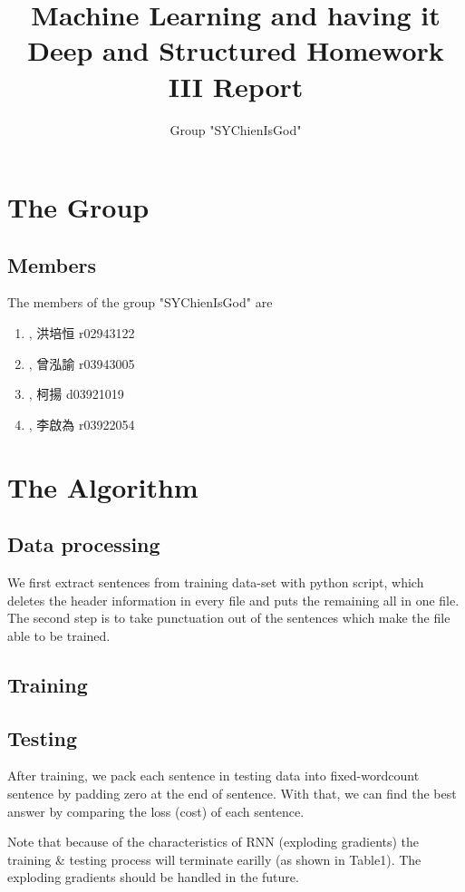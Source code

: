 \documentclass[]{article}
\title{Machine Learning and having it Deep and Structured Homework III Report}
\author{Group "SYChienIsGod"}
\begin{document}
\maketitle


\section{The Group}
\subsection{Members}
The members of the group "SYChienIsGod" are
\begin{CJK}{UTF8}{bsmi}
\begin{enumerate}
	\item , 洪培恒 r02943122
	\item , 曾泓諭 r03943005
	\item , 柯揚   d03921019
	\item , 李啟為 r03922054
\end{enumerate}
\end{CJK}
\section{The Algorithm}

\subsection{Data processing}
We first extract sentences from training data-set with python script, which deletes the header information in every file and puts the remaining all in one file. The second step is to take punctuation out of the sentences which make the file able to be trained.

\subsection{Training}

\subsection{Testing}
After training, we pack each sentence in testing data into fixed-wordcount sentence by padding zero at the end of sentence. With that, we can find the best answer by comparing the loss (cost) of each sentence.

Note that because of the characteristics of RNN (exploding gradients) the training & testing process will terminate earilly (as shown in Table1). The exploding gradients should be handled in the future.
\end{document}
